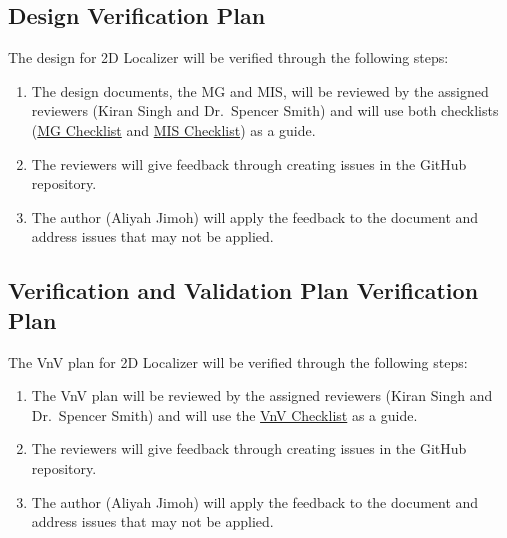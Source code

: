 \documentclass[12pt, titlepage]{article}
\begin{document}

\subsection{Design Verification Plan}\label{plan_design}
The design for 2D Localizer will be verified through the following steps:
\begin{enumerate}
  \item The design documents, the MG and MIS, will be reviewed by the assigned reviewers (Kiran Singh and Dr.~Spencer Smith) and will use both checklists (\href{https://github.com/AliyahJimoh/2D-Localizer/blob/main/docs/Checklists/MG-Checklist.pdf}{MG Checklist} and \href{https://github.com/AliyahJimoh/2D-Localizer/blob/main/docs/Checklists/MIS-Checklist.pdf}{MIS Checklist}) as a guide.
  \item The reviewers will give feedback through creating issues in the GitHub repository.
  \item The author (Aliyah Jimoh) will apply the feedback to the document and address issues that may not be applied.
\end{enumerate}




\subsection{Verification and Validation Plan Verification Plan}\label{plan_verification}

The VnV plan for 2D Localizer will be verified through the following steps:
\begin{enumerate}
  \item The VnV plan will be reviewed by the assigned reviewers (Kiran Singh and Dr.~Spencer Smith) and will use the \href{https://github.com/AliyahJimoh/2D-Localizer/blob/main/docs/Checklists/VnV-Checklist.pdf}{VnV Checklist} as a guide.
  \item The reviewers will give feedback through creating issues in the GitHub repository.
  \item The author (Aliyah Jimoh) will apply the feedback to the document and address issues that may not be applied.
\end{enumerate}

\end{document}
